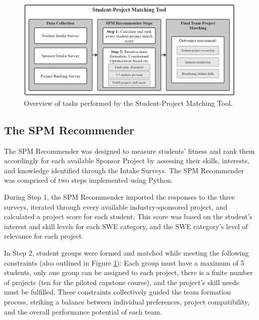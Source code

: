 \begin{figure}
    \centering
    \includegraphics[width=1\linewidth]{Pictures/SPM_Figure.png}
    \caption{Overview of tasks performed by the Student-Project Matching Tool. }
    \label{fig:SPM}
\end{figure}

\subsection{The SPM Recommender}
The SPM Recommender was designed to measure students' fitness and rank them accordingly for each available Sponsor Project by assessing their skills, interests, and knowledge identified through the Intake Surveys. The SPM Recommender was comprised of two steps implemented using Python.

During Step 1, the SPM Recommender imported the responses to the three surveys, iterated through every available industry-sponsored project, and calculated a project score for each student. This score was based on the student's interest and skill levels for each SWE category, and the SWE category's level of relevance for each project. 

In Step 2, student groups were formed and matched while meeting the following constraints (also outlined in Figure \ref{fig:SPM}): Each group must have a maximum of 5 students, only one group can be assigned to each project, there is a finite number of projects (ten for the piloted capstone course), and the project's skill needs must be fulfilled.
These constraints collectively guided the team formation process, striking a balance between individual preferences, project compatibility, and the overall performance potential of each team.

